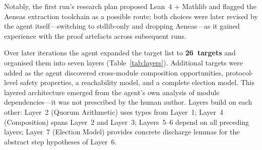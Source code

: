 \documentclass[sigconf,10pt]{acmart}
\begin{document}
Notably, the first run's research plan proposed Lean~4 + Mathlib and
flagged the Aeneas extraction toolchain as a possible route; both
choices were later revised by the agent itself---switching to
stdlib-only and dropping Aeneas---as it gained experience with the
proof artefacts across subsequent runs.

Over later iterations the agent expanded the target list to
\textbf{26~targets} and organised them into seven layers
(Table~\ref{tab:layers}).  Additional targets were added as
the agent discovered cross-module composition opportunities,
protocol-level safety properties,
a reachability model, and a complete election model.
This layered architecture emerged from the
agent's own analysis of module dependencies---it was not prescribed by
the human author.
Layers build on each other: Layer~2 (Quorum Arithmetic) uses types from
Layer~1; Layer~4 (Composition) spans Layer~2 and Layer~3; Layers~5--6
depend on all preceding layers; Layer~7 (Election Model) provides
concrete discharge lemmas for the abstract step hypotheses of Layer~6.
\end{document}
